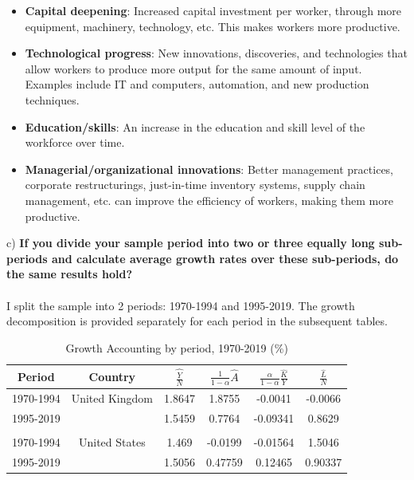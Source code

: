 \documentclass[12pt]{article}
\theoremstyle{mytheoremstyle}
\theoremstyle{mytheoremstyle}
\theoremstyle{myproblemstyle}
\begin{document}
\begin{itemize}
\item \textbf{Capital deepening}: Increased capital investment per worker, through more equipment, machinery, technology, etc. This makes workers more productive.
\item \textbf{Technological progress}: New innovations, discoveries, and technologies that allow workers to produce more output for the same amount of input. Examples include IT and computers, automation, and new production techniques.
\item \textbf{Education/skills}: An increase in the education and skill level of the workforce over time.
\item \textbf{Managerial/organizational innovations}: Better management practices, corporate restructurings, just-in-time inventory systems, supply chain management, etc. can improve the efficiency of workers, making them more productive.
\end{itemize}

\noindent c) \textbf{If you divide your sample period into two or three equally long sub-periods and calculate average growth rates over these sub-periods, do the same results hold?}
\\ \\ 
I split the sample into 2 periods: 1970-1994 and 1995-2019. The growth decomposition is provided separately for each period in the subsequent tables.

\begin{table}[htbp]
    \centering
    \caption{Growth Accounting by period, 1970-2019 (\%)}
    \label{tab:growth-accounting_period}
    \begin{tabular}{@{}cccccc@{}}
    \toprule
    Period & Country & $\widehat{\frac{Y}{N}}$ & $\frac{1}{1-\alpha} \widehat{A}$ & $\frac{\alpha}{1-\alpha} \frac{\widehat{K}}{Y}$ & $\frac{\widehat{L}}{N}$ \\ \midrule
    1970-1994 & United Kingdom &  1.8647 & 1.8755  & -0.0041 & -0.0066  \\
    1995-2019 &  & 1.5459 & 0.7764 & -0.09341 & 0.8629 \\
    \\
    1970-1994 & United States & 1.469 & -0.0199 & -0.01564 & 1.5046 \\
    1995-2019 &  & 1.5056 & 0.47759 & 0.12465 & 0.90337  \\ \bottomrule
    \end{tabular}
    \end{table}
\end{document}
